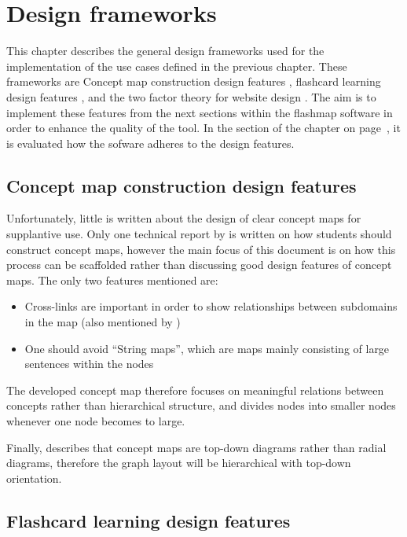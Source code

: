 \chapter{Design frameworks}
\label{ch:frameworks}

This chapter describes the general design frameworks used for the implementation of the use cases defined in the previous chapter. These frameworks are Concept map construction design features \cite{constructcmaps}, flashcard learning design features \cite{nakata}, and the two factor theory for website design \cite{websitedesign}. The aim is to implement these features from the next sections within the flashmap software in order to enhance the quality of the tool. In the  section of the  chapter on page~\pageref{sec:screening}, it is evaluated how the sofware adheres to the design features.

    \section{Concept map construction design features}

Unfortunately, little is written about the design of clear concept maps for supplantive use. Only one technical report by \cite{constructcmaps} is written on how students should construct concept maps, however the main focus of this document is on how this process can be scaffolded rather than discussing good design features of concept maps. The only two features mentioned are:

\begin{itemize}
    \item Cross-links are important in order to show relationships between subdomains in the map (also mentioned by )
    \item One should avoid ``String maps'', which are maps mainly consisting of large sentences within the nodes
\end{itemize}

The developed concept map therefore focuses on meaningful relations between concepts rather than hierarchical structure, and divides nodes into smaller nodes whenever one node becomes to large.

Finally,  describes that concept maps are top-down diagrams rather than radial diagrams, therefore the graph layout will be hierarchical with top-down orientation.

    \section{Flashcard learning design features}

